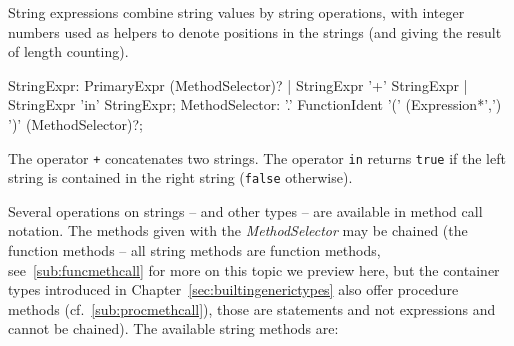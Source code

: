 String expressions combine string values by string operations, with integer numbers used as helpers to denote positions in the strings (and giving the result of length counting).

\begin{rail}
  StringExpr: PrimaryExpr (MethodSelector)? | StringExpr '+' StringExpr | StringExpr 'in' StringExpr;
  MethodSelector: '.' FunctionIdent '(' (Expression*',') ')' (MethodSelector)?;
\end{rail}
The operator \texttt{+} concatenates two strings.
The operator \texttt{in} returns \texttt{true} if the left string is contained in the right string (\texttt{false} otherwise).

Several operations on strings -- and other types -- are available in method call notation.
The methods given with the \emph{MethodSelector} may be chained (the function methods -- all string methods are function methods, see~\ref{sub:funcmethcall} for more on this topic we preview here, but the container types introduced in Chapter~\ref{sec:builtingenerictypes} also offer procedure methods (cf.~\ref{sub:procmethcall}), those are statements and not expressions and cannot be chained).
The available string methods are:

